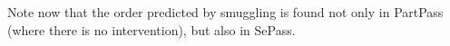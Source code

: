 \documentclass[output=paper]{langsci/langscibook}
\begin{document}
Note now that the order predicted by smuggling is found not only in PartPass (where there is no intervention), but also in SePass. 
% 
% 
% 
% 
% 
% 
% 
% 
% 
% 
% 
% 
% 
% 
\end{document}
